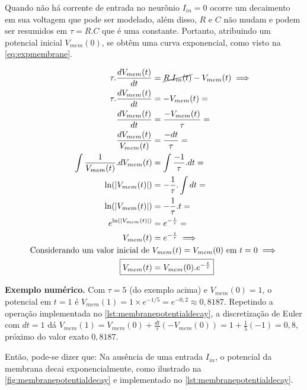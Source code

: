 			\par Quando não há corrente de entrada no neurônio $I_{in} = 0$ ocorre um decaimento em sua voltagem que pode ser modelado, além disso, $R$ e $C$ não mudam e podem ser resumidos em $\tau = R.C$ que é uma constante. Portanto, atribuindo um potencial inicial $V_{mem}(0)$, se obtêm uma curva exponencial, como visto na \autoref{eq:expmembrane}.
			
			\begin{equation}
				\label{eq:expmembrane}
				\begin{aligned}
					\tau.\dfrac{dV_{mem}(t)}{dt} &= \cancel{R.I_{in}(t)} - V_{mem}(t) \implies \\
					\tau.\dfrac{dV_{mem}(t)}{dt} &= -V_{mem}(t) = \\
					\dfrac{dV_{mem}(t)}{dt} &= \dfrac{-V_{mem}(t)}{\tau} = \\
					\dfrac{dV_{mem}(t)}{V_{mem}(t)} &= \dfrac{-dt}{\tau} = \\
					\int\dfrac{1}{V_{mem}(t)}.dV_{mem}(t) &= \int\dfrac{-1}{\tau}.dt = \\
					\ln(|V_{mem}(t)|) &= -\dfrac{1}{\tau} . \int dt = \\
					\ln(|V_{mem}(t)|) &= -\dfrac{1}{\tau} . t = \\
					e^{\ln(|V_{mem}(t)|)} &= e^{-\frac{t}{\tau}} = \\
					V_{mem}(t) &= e^{-\frac{t}{\tau}} \implies \\
					\text{Considerando um valor inicial de } &V_{mem}(t) = V_{mem}(0) \text{ em } t=0 \implies \\
					\Aboxed{V_{mem}(t) &= V_{mem}(0).e^{-\frac{t}{\tau}}}
				\end{aligned}
			\end{equation}
			\par \textbf{Exemplo numérico.} Com $\tau=5$ (do exemplo acima) e $V_{mem}(0)=1$, o potencial em $t=1$ é $V_{mem}(1) = 1\times e^{-1/5} = e^{-0{,}2} \approx 0{,}8187$. Repetindo a operação implementada no \autoref{lst:membranepotentialdecay}, a discretização de Euler com $dt=1$ dá $V_{mem}(1) = V_{mem}(0) + \frac{dt}{\tau}(-V_{mem}(0)) = 1 + \frac{1}{5}(-1) = 0{,}8$, próximo do valor exato $0{,}8187$.
			
			\par Então, pode-se dizer que: Na ausência de uma entrada $I_{in}$, o potencial da membrana decai exponencialmente, como ilustrado na  \autoref{fig:membranepotentialdecay} e implementado no \autoref{lst:membranepotentialdecay}.
			
